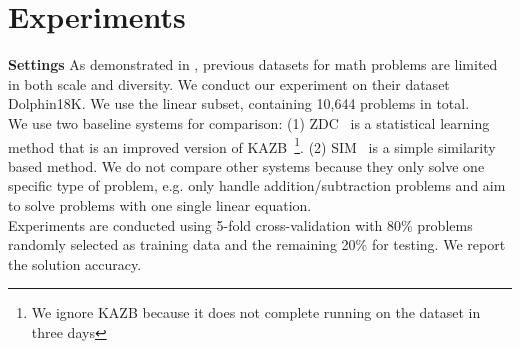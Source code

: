 \documentclass[11pt,letterpaper]{article}
\begin{document}
\section{Experiments}
\label{sec:experiments}
\textbf{Settings } As demonstrated in , previous datasets for math problems are limited in both scale and diversity. We conduct our experiment on their dataset Dolphin18K. We use the linear subset, containing 10,644 problems in total.\\
We use two baseline systems for comparison: (1) ZDC~\cite{lipu2015baidu} is a statistical learning method that is an improved version of KAZB~\cite{kushman2014mit}\footnote{We ignore KAZB because it does not complete running on the dataset in three days}. (2) SIM~\cite{huang2016dolphin18k} is a simple similarity based method. We do not compare other systems because they only solve one specific type of problem, e.g.  only handle addition/subtraction problems and  aim to solve problems with one single linear equation.\\
Experiments are conducted using 5-fold cross-validation with 80\% problems randomly selected as training data and the remaining 20\% for testing. We report the solution accuracy.
\end{document}
